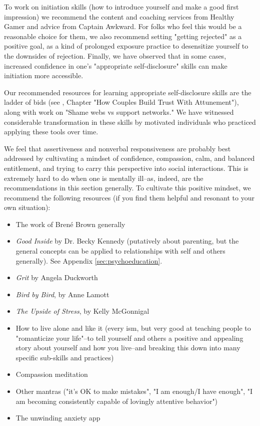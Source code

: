 \documentclass[12pt,letterpaper]{book}
\begin{document}
To work on initiation skills (how to introduce yourself and make a good first impression) we recommend the content and coaching services from Healthy Gamer and advice from Captain Awkward. For folks who feel this would be a reasonable choice for them, we also recommend setting "getting rejected" as a positive goal, as a kind of prolonged exposure practice to desensitize yourself to the downsides of rejection. Finally, we have observed that in some cases, increased confidence in one's "appropriate self-disclosure" skills can make initiation more accessible.

Our recommended resources for learning appropriate self-disclosure skills are the ladder of bids (see \textcite{gottmanTrust}, Chapter "How Couples Build Trust With Attunement"), along with \textcite{brownDaring} work on "Shame webs vs support networks." We have witnessed considerable transformation in these skills by motivated individuals who practiced applying these tools over time.

We feel that assertiveness and nonverbal responsiveness are probably best addressed by cultivating a mindset of confidence, compassion, calm, and balanced entitlement, and trying to carry this perspective into social interactions. This is extremely hard to do when one is mentally ill–as, indeed, are the recommendations in this section generally. To cultivate this positive mindset, we recommend the following resources (if you find them helpful and resonant to your own situation):
\begin{itemize}
	\item The work of Bren{\'e} Brown generally
	\item \textit{Good Inside} by Dr. Becky Kennedy (putatively about parenting, but the general concepts can be applied to relationships with self and others generally). See Appendix \ref{sec:psychoeducation}.
	\item \textit{Grit} by Angela Duckworth
	\item \textit{Bird by Bird}, by Anne Lamott
	\item \textit{The Upside of Stress}, by Kelly McGonnigal
	\item How to live alone and like it (every ism, but very good at teaching people to "romanticize your life"–to tell yourself and others a positive and appealing story about yourself and how you live–and breaking this down into many specific sub-skills and practices)
	\item Compassion meditation
	\item Other mantras ("it's OK to make mistakes", "I am enough/I have enough", "I am becoming consistently capable of lovingly attentive behavior")
	\item The unwinding anxiety app
\end{itemize}
\end{document}
